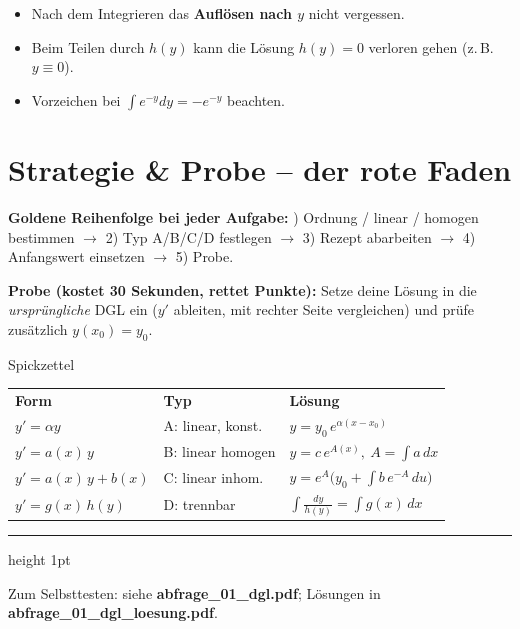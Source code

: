 \documentclass[a4paper,11pt]{article}
\begin{document}
\begin{fehlerbox}
\begin{itemize}[leftmargin=1.4em,itemsep=2pt]
  \item Nach dem Integrieren das \textbf{Auflösen nach $y$} nicht vergessen.
  \item Beim Teilen durch $h(y)$ kann die Lösung $h(y)=0$ verloren gehen (z.\,B.\ $y\equiv0$).
  \item Vorzeichen bei $\int e^{-y}dy=-e^{-y}$ beachten.
\end{itemize}
\end{fehlerbox}

\section{Strategie \& Probe -- der rote Faden}

\begin{merkbox}
\textbf{Goldene Reihenfolge bei jeder Aufgabe:}
) Ordnung / linear / homogen bestimmen
\;$\to$ 2) Typ A/B/C/D festlegen
\;$\to$ 3) Rezept abarbeiten
\;$\to$ 4) Anfangswert einsetzen
\;$\to$ 5) Probe.
\end{merkbox}

\textbf{Probe (kostet 30 Sekunden, rettet Punkte):} Setze deine Lösung in die
\emph{ursprüngliche} DGL ein ($y'$ ableiten, mit rechter Seite vergleichen) und prüfe
zusätzlich $y(x_0)=y_0$.

\begin{satzbox}{Spickzettel}
\renewcommand{\arraystretch}{1.5}
\begin{tabular}{@{}p{4.3cm}p{3.5cm}p{6.6cm}@{}}
\textbf{Form} & \textbf{Typ} & \textbf{Lösung} \\[2pt]
$y'=\alpha y$ & A: linear, konst. & $y=y_0\,e^{\alpha(x-x_0)}$ \\
$y'=a(x)\,y$ & B: linear homogen & $y=c\,e^{A(x)},\ A=\int a\,dx$ \\
$y'=a(x)\,y+b(x)$ & C: linear inhom. & $y=e^{A}\big(y_0+\int b\,e^{-A}\,du\big)$ \\
$y'=g(x)\,h(y)$ & D: trennbar & $\int\frac{dy}{h(y)}=\int g(x)\,dx$ \\
\end{tabular}
\end{satzbox}

\vfill
{\color{gridcol}\hrule height 1pt}
\vspace{0.3em}
{\color{gridcol}\small Zum Selbsttesten: siehe \textbf{abfrage\_01\_dgl.pdf}; Lösungen in
\textbf{abfrage\_01\_dgl\_loesung.pdf}.}
\end{document}
